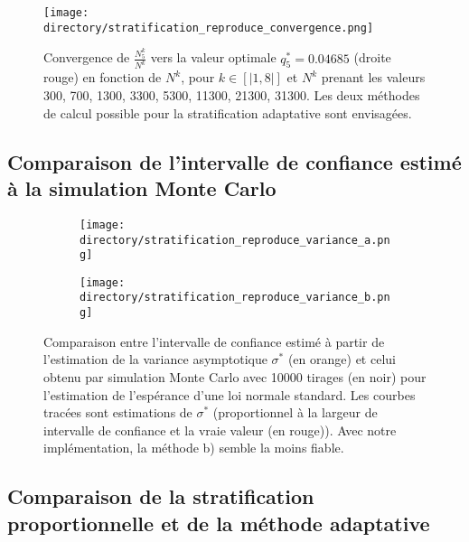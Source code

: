 \documentclass[12pt,a4paper]{report}
\def \directory {/home/jonathan/Programmation/C++/Projet_C++_S2/Images}
\begin{document}
\begin{figure}[H]
\centering
	\texttt{[image: \\directory/stratification\_reproduce\_convergence.png]}
	
\caption{\small Convergence de $\frac{N^{k}_{5}}{N^{k}}$ vers la valeur optimale $q_{5}^{*} = 0.04685$ (droite rouge) en fonction de $N^{k}$, pour $k \in [|1,8|]$ et $N^{k}$ prenant les valeurs 300, 700, 1300, 3300, 5300, 11300, 21300, 31300. Les deux méthodes de calcul possible pour la stratification adaptative sont envisagées.}
\label{fig:strat_convergence_proportion}
\end{figure}

\subsection{Comparaison de l'intervalle de confiance estimé à la simulation Monte Carlo}

\begin{figure}[H]
\centering
	\begin{subfigure}[scale=1]{0.45\textwidth}
			\texttt{[image: \\directory/stratification\_reproduce\_variance\_a.png]}
	\end{subfigure}
	\hfill
	\begin{subfigure}[scale=1]{0.45\textwidth}
		\texttt{[image: \\directory/stratification\_reproduce\_variance\_b.png]}
	\end{subfigure}

	
\caption{\small Comparaison entre l'intervalle de confiance estimé à partir de l'estimation de la variance asymptotique $\sigma^{*}$ (en orange) et celui obtenu par simulation Monte Carlo avec 10000 tirages (en noir) pour l'estimation de l'espérance d'une loi normale standard. Les courbes tracées sont estimations de $\sigma^{*}$ (proportionnel à la largeur de intervalle de confiance et la vraie valeur (en rouge)). Avec notre implémentation, la méthode b) semble la moins fiable.}
\label{fig:strat_comparaison_sigma}
\end{figure}

\subsection{Comparaison de la stratification proportionnelle et de la méthode adaptative}
\end{document}
